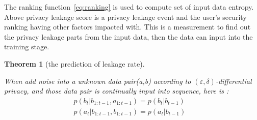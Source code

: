 \documentclass[journal,transmag]{IEEEtran}
\newtheorem{theorem}{Theorem}%
\begin{document}
The ranking function~\eqref{eq:ranking} is used to compute set of input data entropy. Above privacy leakage score is a privacy leakage event and the user’s security ranking having other factors impacted with. This is a measurement to find out the privacy leakage parts from the input data, then the data can input into the training stage.

\begin{theorem} [the prediction of leakage rate] \label{thm:leakagerate} 

When add noise into a unknown data pair(a,b) according to $(\varepsilon,\delta)$-differential privacy, and those data pair is continually input into sequence, here is : 
\begin{equation}\label{eq:crfinpl}
\begin{array}{cc}
      p(b_t|b_{1:t-1},a_{1:t-1}) = p(b_t|b_{t-1})  &  \\
 p(a_t|b_{1:t-1},b_{1:t-1}) = p(a_t|b_{t-1})    
\end{array}
\end{equation}
\end{theorem}
\end{document}
